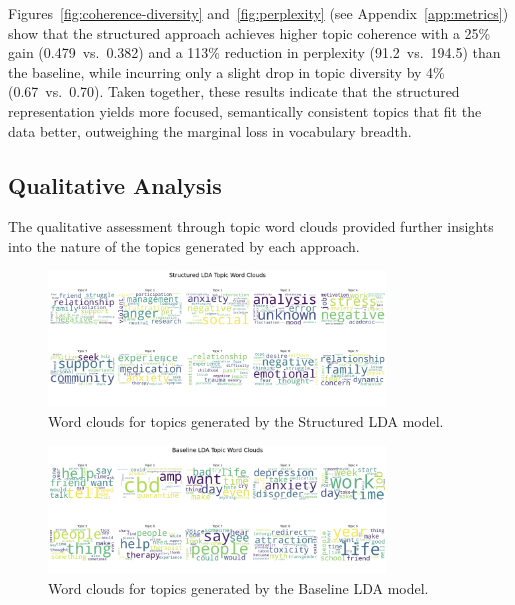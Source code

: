 \documentclass{article}
\begin{document}
\noindent
Figures~\ref{fig:coherence-diversity} and~\ref{fig:perplexity} (see Appendix~\ref{app:metrics}) show that the structured approach achieves higher topic coherence with a 25\% gain (0.479~vs.\ 0.382) and a 113\% reduction in perplexity (91.2~vs.\ 194.5) than the baseline, while incurring only a slight drop in topic diversity by 4\% (0.67~vs.\ 0.70). Taken together, these results indicate that the structured representation yields more focused, semantically consistent topics that fit the data better, outweighing the marginal loss in vocabulary breadth.



\subsection{Qualitative Analysis}
The qualitative assessment through topic word clouds provided further insights into the nature of the topics generated by each approach.

\begin{figure}[ht]
    \centering
    \includegraphics[width=0.8\textwidth]{plots/structuredLDATopicWordClouds.jpeg}
    \caption{Word clouds for topics generated by the Structured LDA model.}
    \label{fig:wordcloud-structured}
\end{figure}

\begin{figure}[ht]
    \centering
    \includegraphics[width=0.8\textwidth]{plots/BaselineLDATopicWordClouds.jpeg}
    \caption{Word clouds for topics generated by the Baseline LDA model.}
    \label{fig:wordcloud-baseline}
\end{figure}
\end{document}
